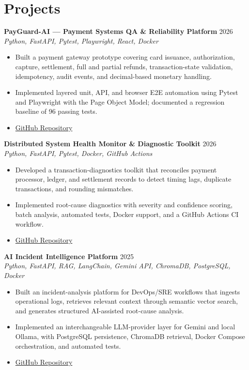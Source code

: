 \documentclass[a4paper,9.5pt]{article}
\begin{document}
\section{Projects}
\textbf{PayGuard-AI --- Payment Systems QA \& Reliability Platform} \hfill 2026\\
\textit{\small Python, FastAPI, Pytest, Playwright, React, Docker}
\begin{itemize}\small
\item Built a payment gateway prototype covering card issuance, authorization, capture, settlement, full and partial refunds, transaction-state validation, idempotency, audit events, and decimal-based monetary handling.
\item Implemented layered unit, API, and browser E2E automation using Pytest and Playwright with the Page Object Model; documented a regression baseline of 96 passing tests.
\item \href{https://github.com/Atharvagarud137/PayGuard-AI}{GitHub Repository}
\end{itemize}
\textbf{Distributed System Health Monitor \& Diagnostic Toolkit} \hfill 2026\\
\textit{\small Python, FastAPI, Pytest, Docker, GitHub Actions}
\begin{itemize}\small
\item Developed a transaction-diagnostics toolkit that reconciles payment processor, ledger, and settlement records to detect timing lags, duplicate transactions, and rounding mismatches.
\item Implemented root-cause diagnostics with severity and confidence scoring, batch analysis, automated tests, Docker support, and a GitHub Actions CI workflow.
\item \href{https://github.com/Atharvagarud137/distributed-system-diagnostics}{GitHub Repository}
\end{itemize}
\textbf{AI Incident Intelligence Platform} \hfill 2025\\
\textit{\small Python, FastAPI, RAG, LangChain, Gemini API, ChromaDB, PostgreSQL, Docker}
\begin{itemize}\small
\item Built an incident-analysis platform for DevOps/SRE workflows that ingests operational logs, retrieves relevant context through semantic vector search, and generates structured AI-assisted root-cause analysis.
\item Implemented an interchangeable LLM-provider layer for Gemini and local Ollama, with PostgreSQL persistence, ChromaDB retrieval, Docker Compose orchestration, and automated tests.
\item \href{https://github.com/Atharvagarud137/ai-incident-intelligence-platform}{GitHub Repository}
\end{itemize}
\end{document}
